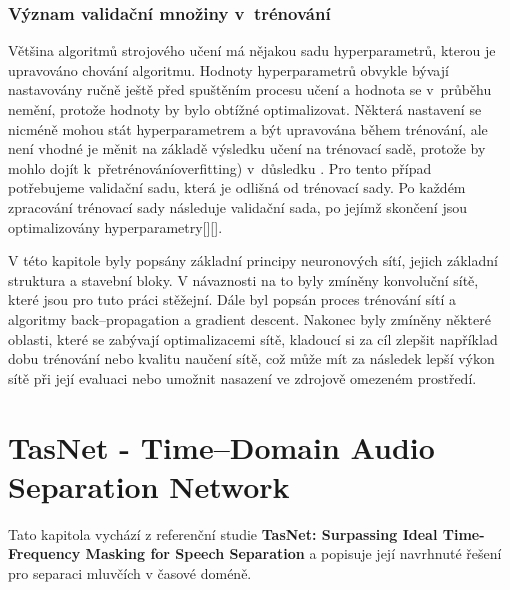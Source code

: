 \subsection{Význam validační množiny v~trénování}
Většina algoritmů strojového učení má nějakou sadu hyperparametrů, kterou je upravováno chování algoritmu. Hodnoty hyperparametrů obvykle bývají nastavovány ručně ještě před spuštěním procesu učení a hodnota se v~průběhu nemění, protože hodnoty by bylo obtížné optimalizovat. 
Některá nastavení se nicméně mohou stát hyperparametrem a být upravována během trénování, ale není vhodné je měnit na základě výsledku učení na trénovací sadě, protože by mohlo dojít k~přetrénováníoverfitting) v~důsledku . Pro tento případ potřebujeme validační sadu, která je odlišná od trénovací sady.
Po každém zpracování trénovací sady následuje validační sada, po jejímž skončení jsou optimalizovány hyperparametry[][].


V této kapitole byly popsány základní principy neuronových sítí, jejich základní struktura a stavební bloky. V návaznosti na to byly zmíněny konvoluční sítě, které jsou pro tuto práci stěžejní. Dále byl popsán proces trénování sítí a algoritmy back--propagation a gradient descent. Nakonec byly zmíněny některé oblasti, které se zabývají optimalizacemi sítě, kladoucí si za cíl zlepšit například dobu trénování nebo kvalitu naučení sítě, což může mít za následek lepší výkon sítě při její evaluaci nebo umožnit nasazení ve zdrojově omezeném prostředí.

\chapter{TasNet - Time--Domain Audio Separation Network}
\label{tasnet}

Tato kapitola vychází z referenční studie \textbf{TasNet: Surpassing Ideal Time-Frequency Masking for Speech Separation}\cite{luo2018convtasnet} a popisuje její navrhnuté řešení pro separaci mluvčích v časové doméně.

